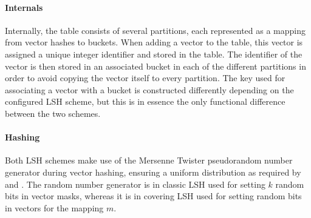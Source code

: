 \paragraph{Internals} Internally, the table consists of several partitions, each represented as a mapping from vector hashes to buckets. When adding a vector to the table, this vector is assigned a unique integer identifier and stored in the table. The identifier of the vector is then stored in an associated bucket in each of the different partitions in order to avoid copying the vector itself to every partition. The key used for associating a vector with a bucket is constructed differently depending on the configured LSH scheme, but this is in essence the only functional difference between the two schemes.

\paragraph{Hashing} Both LSH schemes make use of the Mersenne Twister pseudorandom number generator during vector hashing, ensuring a uniform distribution as required by \cite{DBLP:conf/stoc/IndykM98} and \cite{DBLP:journals/corr/Pagh15}. The random number generator is in classic LSH used for setting $k$ random bits in vector masks, whereas it is in covering LSH used for setting random bits in vectors for the mapping $m$.

